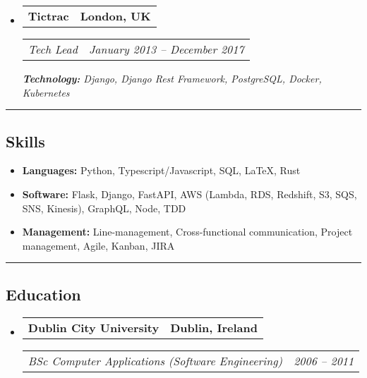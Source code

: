 \documentclass[11pt,letterpaper]{article}
\makeatletter
\newcommand{\headerrow}[2]
{\begin{tabular*}{\linewidth}{l@{\extracolsep{\fill}}r}
#1 &
#2 \\
\end{tabular*}}
\makeatother
\begin{document}
\begin{itemize}[leftmargin=1em]
  \item
        \headerrow
        {\textbf{Tictrac}}
        {\textbf{London, UK}}
        \headerrow
        {\emph{Tech Lead}}
        {\emph{January 2013 -- December 2017}}
        {\emph{\textbf{Technology:} Django, Django Rest Framework, PostgreSQL, Docker, Kubernetes}}
\end{itemize}

\hrule
\vspace{-1em}
\subsection*{\Large Skills}

\begin{itemize}[leftmargin=1em,noitemsep]
  \item \textbf{Languages:}
        Python, Typescript/Javascript, SQL, \LaTeX, Rust
  \item \textbf{Software:}
        Flask, Django, FastAPI, AWS (Lambda, RDS, Redshift, S3, SQS, SNS, Kinesis), GraphQL, Node, TDD
  \item \textbf{Management:}
        Line-management, Cross-functional communication, Project management, Agile, Kanban, JIRA
\end{itemize}

\hrule
\vspace{-1em}
\subsection*{\Large Education}

\begin{itemize}[leftmargin=1em]
  \parskip=0.1em

  \item
        \headerrow
        {\textbf{Dublin City University}}
        {\textbf{Dublin, Ireland}}
        \headerrow
        {\emph{BSc Computer Applications (Software Engineering)}}
        {\emph{2006 -- 2011 }}


\end{itemize}
\end{document}

